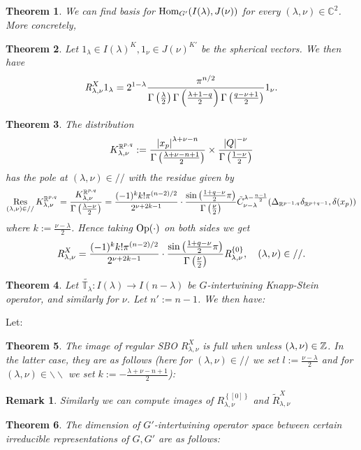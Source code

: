 \documentclass[10pt]{article} %
\newtheorem{theorem}{Theorem}
\newcommand{\Hom}{\mbox{\normalfont Hom}}
\newtheorem{remark}{Remark}
\newcommand{\Op}{\mbox{\normalfont Op}}
\newcommand{\Res}{\operatorname{Res}\displaylimits}
\newcommand{\OpR}{\mbox{\it R}}
\begin{document}
\begin{theorem}
		We can find basis for $\Hom_{G'}(I(\lambda),J(\nu))$ for every $(\lambda,\nu)\in \mathbb{C}^2$. More concretely,
\end{theorem}
\begin{theorem}
	Let $1_\lambda\in I(\lambda)^K,1_\nu\in J(\nu)^{K'}$ be the spherical vectors. We then have
\[ \OpR^X_{\lambda, \nu} 1_{\lambda} = 2^{1 -
\lambda} \frac{\pi^{n / 2}}{\Gamma \left( \frac{\lambda}{2} \right)
\Gamma \left(  \frac{\lambda + 1-q}{2} \right) \Gamma \left(
\frac{q - \nu + 1}{2} \right)} 1_{\nu}. \]
\end{theorem}
	\begin{theorem}
		The distribution
		\[K_{\lambda,\nu}^{\mathbb{R}^{p,q}}:=\frac{\left|x_p\right|^{\lambda+\nu-n}}{\Gamma\left( \frac{\lambda+\nu-n+1}{2} \right)}\times
		\frac{\left|Q\right|^{-\nu}}{\Gamma\left( \frac{1-\nu}{2} \right)}\]
		has the pole at $(\lambda,\nu)\in//$ with the residue given by
		\[\Res_{(\lambda,\nu)\in//}K_{\lambda,\nu}^{\mathbb{R}^{p,q}}=\frac{K_{\lambda,\nu}^{\mathbb{R}^{p,q}}}{\Gamma\left( \frac{\lambda-\nu}{2} \right)}
			=\frac{ (- 1)^k k!\pi^{(n - 2) / 2} 
		}{2^{ \nu + 2 k-1}}\cdot  \frac{\sin\left( \frac{1+q-\nu}{2}\pi \right)}{\Gamma\left( \frac{\nu}{2} \right)}
	\tilde{C}_{\nu - \lambda}^{\lambda - \frac{n
  	- 1}{2}} ({\Delta}_{\mathbb{R}^{p-1,q}} {\delta}_{\mathbb{R}^{p+q-1}}, \delta (x_p))
		\]
		where $k:=\frac{\nu-\lambda}{2}$.
		Hence taking $\Op(\cdot)$ on both sides we get
  \[\OpR_{\lambda,\nu}^X  = \frac{ (- 1)^k k!\pi^{(n - 2) / 2} 
		}{2^{ \nu + 2 k-1}}\cdot  \frac{\sin\left( \frac{1+q-\nu}{2}\pi \right)}{\Gamma\left( \frac{\nu}{2} \right)}
     \OpR_{\lambda,\nu}^{ \left\{ 0 \right\} },\quad(\lambda,\nu)\in// . \]
	\end{theorem}
	\begin{theorem}
		Let $\tilde{\mathbb{T}_{\lambda}}:I(\lambda)\to I(n-\lambda)$ be $G$-intertwining Knapp-Stein operator, and similarly for $\nu$. Let $n':=n-1$. We then have:
	\end{theorem}
	Let:\\
\begin{theorem}
	The image of regular SBO $R_{\lambda,\nu}^X$ is full when unless $(\lambda,\nu)\in\mathbb{Z}$. In the latter case, they are as follows
	(here for $(\lambda,\nu)\in//$ we set $l:=\frac{\nu-\lambda}{2}$ and for $(\lambda,\nu)\in\backslash\backslash$ we set
	$k:=-\frac{\lambda+\nu-n+1}{2}$):\\
\end{theorem}
\begin{remark}
	Similarly we can compute images of $R_{\lambda,\nu}^{ \left\{ [0] \right\}}$ and $\tilde{R}_{\lambda,\nu}^{X}$
\end{remark}
\begin{theorem}
	The dimension of $G'$-intertwining operator space between certain irreducible representations of $G,G'$ are as follows:\\
\end{theorem}
\end{document}
